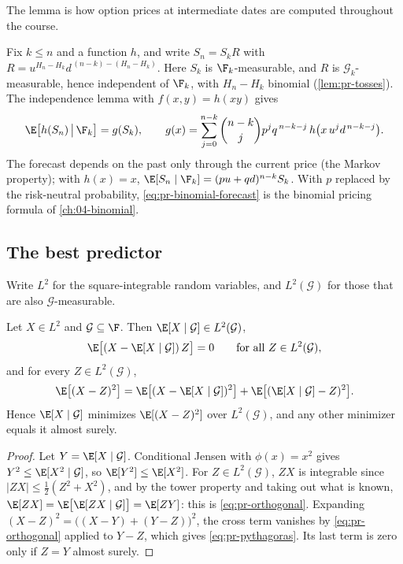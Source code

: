 The lemma is how option prices at intermediate dates are computed throughout the course.

\begin{example}\label{exa:pr-markov}
Fix $k\le n$ and a function $h$, and write $S_n=S_kR$ with
$R=u^{H_n-H_k}d^{\,(n-k)-(H_n-H_k)}$. Here $S_k$ is $\F_k$-measurable, and $R$ is
$\mathcal G_k$-measurable, hence independent of $\F_k$, with $H_n-H_k$ binomial
(\cref{lem:pr-tosses}). The independence lemma with $f(x,y)=h(xy)$ gives
\begin{equation}\label{eq:pr-binomial-forecast}
  \E\big[h(S_n)\,\big|\,\F_k\big]=g(S_k),\qquad
  g(x)=\sum_{j=0}^{n-k}\binom{n-k}{j}p^jq^{\,n-k-j}\,h\big(x\,u^jd^{\,n-k-j}\big).
\end{equation}
The forecast depends on the past only through the current price (the Markov property);
with $h(x)=x$, $\E[S_n\mid\F_k]=(pu+qd)^{n-k}S_k$. With $p$ replaced by the risk-neutral
probability, \eqref{eq:pr-binomial-forecast} is the binomial pricing formula of
\cref{ch:04-binomial}.
\end{example}

\subsection{The best predictor}

Write $L^2$ for the square-integrable random variables, and $L^2(\mathcal G)$ for those that
are also $\mathcal G$-measurable.

\begin{proposition}\label{prop:pr-projection}
Let $X\in L^2$ and $\mathcal G\subseteq\F$. Then $\E[X\mid\mathcal G]\in L^2(\mathcal G)$,
\begin{equation}\label{eq:pr-orthogonal}
  \E\big[(X-\E[X\mid\mathcal G])\,Z\big]=0\qquad\text{for all }Z\in L^2(\mathcal G),
\end{equation}
and for every $Z\in L^2(\mathcal G)$,
\begin{equation}\label{eq:pr-pythagoras}
  \E\big[(X-Z)^2\big]=\E\big[(X-\E[X\mid\mathcal G])^2\big]+\E\big[(\E[X\mid\mathcal G]-Z)^2\big].
\end{equation}
Hence $\E[X\mid\mathcal G]$ minimizes $\E[(X-Z)^2]$ over $L^2(\mathcal G)$, and any other
minimizer equals it almost surely.
\end{proposition}

\begin{proof}
Let $Y=\E[X\mid\mathcal G]$. Conditional Jensen with $\phi(x)=x^2$ gives
$Y^2\le\E[X^2\mid\mathcal G]$, so $\E[Y^2]\le\E[X^2]$. For $Z\in L^2(\mathcal G)$, $ZX$ is
integrable since $|ZX|\le\frac12(Z^2+X^2)$, and by the tower property and taking out what
is known, $\E[ZX]=\E\big[\E[ZX\mid\mathcal G]\big]=\E[ZY]$: this is \eqref{eq:pr-orthogonal}.
Expanding $(X-Z)^2=\big((X-Y)+(Y-Z)\big)^2$, the cross term vanishes by
\eqref{eq:pr-orthogonal} applied to $Y-Z$, which gives \eqref{eq:pr-pythagoras}. Its last
term is zero only if $Z=Y$ almost surely.
\end{proof}

